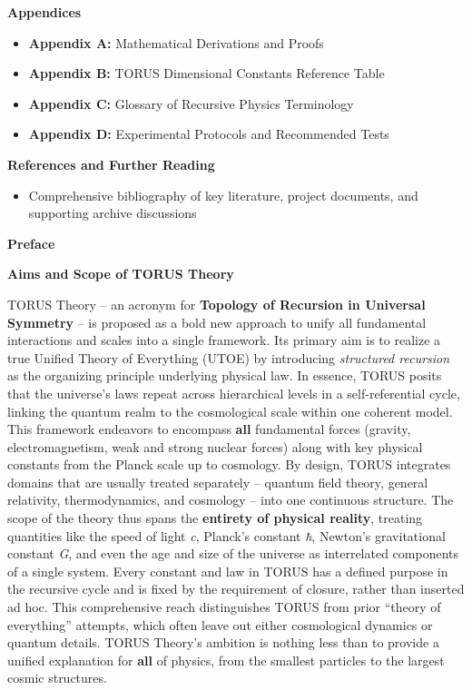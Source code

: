 \textbf{Appendices}

\begin{itemize}
\item
  \textbf{Appendix A:} Mathematical Derivations and Proofs
\item
  \textbf{Appendix B:} TORUS Dimensional Constants Reference Table
\item
  \textbf{Appendix C:} Glossary of Recursive Physics Terminology
\item
  \textbf{Appendix D:} Experimental Protocols and Recommended Tests
\end{itemize}

\textbf{References and Further Reading}

\begin{itemize}
\item
  Comprehensive bibliography of key literature, project documents, and
  supporting archive discussions
\end{itemize}

\textbf{Preface}

\textbf{Aims and Scope of TORUS Theory}

TORUS Theory -- an acronym for \textbf{Topology of Recursion in
Universal Symmetry} -- is proposed as a bold new approach to unify all
fundamental interactions and scales into a single framework. Its primary
aim is to realize a true Unified Theory of Everything (UTOE) by
introducing \emph{structured recursion} as the organizing principle
underlying physical law. In essence, TORUS posits that the universe's
laws repeat across hierarchical levels in a self-referential cycle,
linking the quantum realm to the cosmological scale within one coherent
model. This framework endeavors to encompass \textbf{all} fundamental
forces (gravity, electromagnetism, weak and strong nuclear forces) along
with key physical constants from the Planck scale up to cosmology​. By
design, TORUS integrates domains that are usually treated separately --
quantum field theory, general relativity, thermodynamics, and cosmology
-- into one continuous structure. The scope of the theory thus spans the
\textbf{entirety of physical reality}, treating quantities like the
speed of light \emph{c}, Planck's constant \emph{ħ}, Newton's
gravitational constant \emph{G}, and even the age and size of the
universe as interrelated components of a single system. Every constant
and law in TORUS has a defined purpose in the recursive cycle and is
fixed by the requirement of closure, rather than inserted ad hoc​. This
comprehensive reach distinguishes TORUS from prior ``theory of
everything'' attempts, which often leave out either cosmological
dynamics or quantum details. TORUS Theory's ambition is nothing less
than to provide a unified explanation for \textbf{all} of physics, from
the smallest particles to the largest cosmic structures​.

